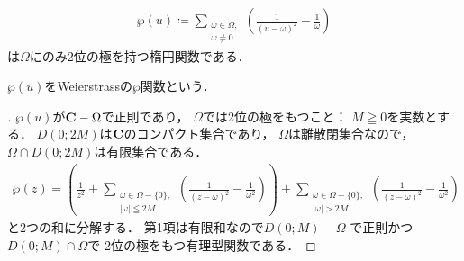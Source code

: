 \begin{Theorem}
    \begin{align}
        \wp(u)\coloneqq 
        \sum_{\substack{\omega\in\Omega,\\\omega\ne 0}}
        \left(\frac{1}{(u-\omega)^2}-\frac{1}{\omega}\right)
    \end{align}
    は$\Omega$にのみ2位の極を持つ楕円関数である．
\end{Theorem}$\wp(u)$をWeierstrassの$\wp$関数という．
\begin{proof}[\pfb]
    $\wp(u)$が$\mathbf{C}-\Omega$で正則であり，
    $\Omega$では2位の極をもつこと：
    $M\geqq0$を実数とする．
    $D(0;2M)$は$\mathbf{C}$のコンパクト集合であり，
    $\Omega$は離散閉集合なので，
    $\Omega\cap D(0;2M)$は有限集合である．
    \begin{align*}
        \wp(z)
        =\left(
            \frac{1}{z^2}
            +\sum_{
                \substack{\omega\in\Omega-\{0\},\\|\omega|\leqq2M}
            }
            \left(
                \frac{1}{(z-\omega)^2}-\frac{1}{\omega^2}
            \right)
        \right)
        +\sum_{
            \substack{\omega\in\Omega-\{0\},\\|\omega|>2M}
        }\left(
            \frac{1}{(z-\omega)^2}-\frac{1}{\omega^2}
        \right)
    \end{align*}
    と2つの和に分解する．
    第1項は有限和なので$\overline{D(0;M)}-\Omega$
    で正則かつ$\overline{D(0;M)}\cap\Omega$で
    2位の極をもつ有理型関数である．


\end{proof}
